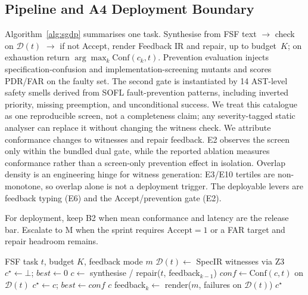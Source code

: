 \documentclass[10pt,conference]{IEEEtran}
\begin{document}
\subsection{Pipeline and A4 Deployment Boundary}
Algorithm~\ref{alg:sgdp} summarises one task.
Synthesise from FSF text $\to$ check on $\mathcal{D}(t)$ $\to$
if not Accept, render Feedback IR and repair, up to budget~$K$; on exhaustion
return $\arg\max_k\mathrm{Conf}(c_k,t)$.
Prevention evaluation injects specification-confusion and
implementation-screening mutants and scores PDR/FAR on the faulty set.
The second gate is instantiated by 14 AST-level safety smells derived from
SOFL fault-prevention patterns, including inverted priority, missing
preemption, and unconditional success.
We treat this catalogue as one reproducible screen, not a completeness claim;
any severity-tagged static analyser can replace it without changing the
witness check.
We attribute conformance changes to witnesses and repair feedback.
E2 observes the screen only within the bundled dual gate, while the reported
ablation measures conformance rather than a screen-only prevention effect in
isolation.
Overlap density is an engineering hinge for witness generation: E3/E10
tertiles are non-monotone, so overlap alone is not a deployment trigger.
The deployable levers are feedback typing (E6) and the Accept/prevention gate
(E2).

For deployment, keep B2 when mean conformance and latency are the release bar.
Escalate to M when the sprint requires $\mathrm{Accept}{=}1$ or a FAR target
and repair headroom remains.

\begin{algorithm}[t]
\caption{Witness-guided repair with dual-gate acceptance}
\label{alg:sgdp}
\begin{algorithmic}[1]
\Require FSF task $t$, budget $K$, feedback mode $m$
\State $\mathcal{D}(t)\gets$ SpecIR witnesses via Z3
\State $c^\star\gets\bot$; $\mathit{best}\gets 0$
  \State $c\gets$ synthesise / repair($t$, feedback$_{k-1}$)
  \State $\mathit{conf}\gets\mathrm{Conf}(c,t)$ on $\mathcal{D}(t)$
   $c^\star\gets c$; $\mathit{best}\gets\mathit{conf}$
  \EndIf
   \Return $c$
  \EndIf
  \State feedback$_k\gets$ render($m$, failures on $\mathcal{D}(t)$)
\EndFor
\State \Return $c^\star$ 
\end{algorithmic}
\end{algorithm}

\end{document}
